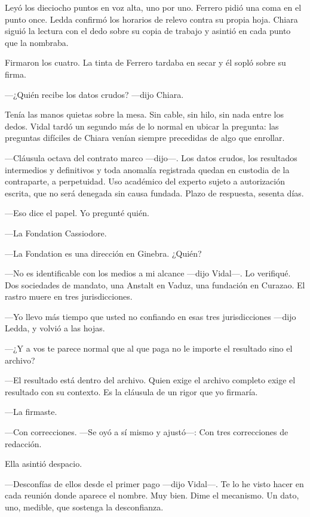 Leyó los dieciocho puntos en voz alta, uno por uno. Ferrero pidió una coma en el punto once. Ledda confirmó los horarios de relevo contra su propia hoja. Chiara siguió la lectura con el dedo sobre su copia de trabajo y asintió en cada punto que la nombraba.

Firmaron los cuatro. La tinta de Ferrero tardaba en secar y él sopló sobre su firma.

---¿Quién recibe los datos crudos? ---dijo Chiara.

Tenía las manos quietas sobre la mesa. Sin cable, sin hilo, sin nada entre los dedos. Vidal tardó un segundo más de lo normal en ubicar la pregunta: las preguntas difíciles de Chiara venían siempre precedidas de algo que enrollar.

---Cláusula octava del contrato marco ---dijo---. Los datos crudos, los resultados intermedios y definitivos y toda anomalía registrada quedan en custodia de la contraparte, a perpetuidad. Uso académico del experto sujeto a autorización escrita, que no será denegada sin causa fundada. Plazo de respuesta, sesenta días.

---Eso dice el papel. Yo pregunté quién.

---La Fondation Cassiodore.

---La Fondation es una dirección en Ginebra. ¿Quién?

---No es identificable con los medios a mi alcance ---dijo Vidal---. Lo verifiqué. Dos sociedades de mandato, una Anstalt en Vaduz, una fundación en Curazao. El rastro muere en tres jurisdicciones.

---Yo llevo más tiempo que usted no confiando en esas tres jurisdicciones ---dijo Ledda, y volvió a las hojas.

---¿Y a vos te parece normal que al que paga no le importe el resultado sino el archivo?

---El resultado está dentro del archivo. Quien exige el archivo completo exige el resultado con su contexto. Es la cláusula de un rigor que yo firmaría.

---La firmaste.

---Con correcciones. ---Se oyó a sí mismo y ajustó---: Con tres correcciones de redacción.

Ella asintió despacio.

---Desconfías de ellos desde el primer pago ---dijo Vidal---. Te lo he visto hacer en cada reunión donde aparece el nombre. Muy bien. Dime el mecanismo. Un dato, uno, medible, que sostenga la desconfianza.

